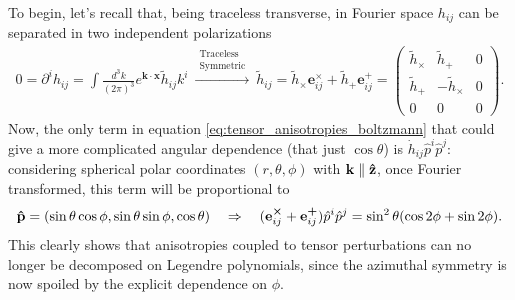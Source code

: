 To begin, let's recall that, being traceless transverse, in Fourier space $h_{ij}$ can be separated in two independent polarizations
\begin{align*}
    0=\partial^ih_{ij}=\int\frac{d^3k}{(2\pi)^3}e^{\mathbf{k}\cdot\mathbf{x}}\tilde h_{ij}k^i \ \xrightarrow{\substack{\text{Traceless}\\\text{Symmetric}}}\ \tilde h_{ij}=\tilde h_{\boldsymbol \times} \mathbf{e}_{ij}^{\boldsymbol \times}+\tilde h_{\boldsymbol +} \mathbf{e}_{ij}^{\boldsymbol +}=
    \begin{pmatrix}
        \tilde h_{\boldsymbol \times} & \tilde h_{\boldsymbol +} & 0\\
        \tilde h_{\boldsymbol +} & -\tilde h_{\boldsymbol \times} & 0\\
        0&0&0
    \end{pmatrix}.
\end{align*}
Now, the only term in equation \eqref{eq:tensor_anisotropies_boltzmann} that could give a more complicated angular dependence (that just $\cos\theta$) is $\dot{h}_{ij}\hat p^i\hat p^j$: considering spherical polar coordinates $(r,\theta,\phi)$ with $\mathbf k\parallel \mathbf{\hat{z}}$, once Fourier transformed, this term will be proportional to
\begin{align*}
    \mathbf{\hat{p}}=(\sin\theta\cos\phi,\sin\theta\sin\phi,\cos\theta)\quad \Rightarrow\quad (\mathbf{e}_{ij}^{\boldsymbol \times}+\mathbf{e}_{ij}^{\boldsymbol +})\hat p^i\hat p^j=\sin^2\theta(\cos2\phi+\sin2\phi).
\end{align*} 
This clearly shows that anisotropies coupled to tensor perturbations can no longer be decomposed on Legendre polynomials, since the azimuthal symmetry is now spoiled by the explicit dependence on $\phi$.


